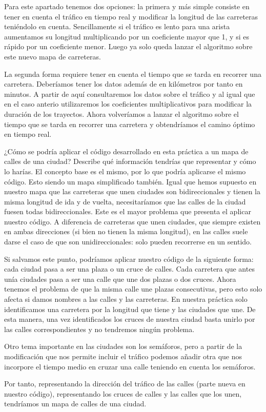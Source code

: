 \documentclass[11pt, a4paper, spanish, openright, twoside]{book}
\begin{document}
	\begin{section}
		Para este apartado tenemos dos opciones: la primera y más simple consiste en tener en cuenta el tráfico en tiempo real y modificar la longitud de las carreteras teniéndolo en cuenta. Sencillamente 
		si el tráfico es lento para una arista aumentamos su longitud multiplicando por un coeficiente mayor que 1, y si es rápido por un coeficiente menor. Luego ya solo queda lanzar el algoritmo sobre este 
		nuevo mapa de carreteras.

		La segunda forma requiere tener en cuenta el tiempo que se tarda en recorrer una carretera. Deberíamos tener los datos además de en kilómetros por tanto en minutos. A partir de aquí consultaremos los datos sobre el tráfico 
		y al igual que en el caso anterio utilizaremos los coeficientes multiplicativos para modificar la duración de los trayectos. Ahora volveríamos a lanzar el algoritmo sobre el tiempo que se tarda en recorrer una carretera y obtendríamos 
		el camino óptimo en tiempo real.


	\end{section}

	\begin{section}{¿Cómo se podría aplicar el código desarrollado en esta práctica a un mapa de calles de una ciudad? Describe qué información tendrías que representar y cómo lo harías.}
		El concepto base es el mismo, por lo que podría aplicarse el mismo código. Esto siendo un mapa simplificado también. Igual que hemos supuesto en nuestro mapa que las carreteras que unen ciudades son
 		bidireccionales y tienen la misma longitud de ida y de vuelta, necesitaríamos que las calles de la ciudad fuesen todas bidireccionales. Este es el mayor problema que presenta el aplicar nuestro código. A diferencia 
		de carreteras que unen ciudades, que siempre existen en ambas direcciones (si bien no tienen la misma longitud), en las calles suele darse el caso de que son unidireccionales: solo pueden recorrerse en un sentido.
		 
		Si salvamos este punto, podríamos aplicar nuestro código de la siguiente forma: cada ciudad pasa a ser una plaza o un cruce de calles. Cada carretera que antes unía ciudades  pasa a ser una calle que une dos 
		plazas o dos cruces. Ahora tenemos el problema de que la misma calle une plazas consecutivas, pero esto solo afecta si damos nombres a las calles y las carreteras. En nuestra práctica solo identificamos una carretera por 
		la longitud que tiene y las ciudades que une. De esta manera, una vez identificados los cruces de nuestra ciudad basta unirlo por las calles correspondientes y no tendremos ningún problema.

		Otro tema importante en las ciudades son los semáforos, pero a partir de  la modificación que nos permite incluir el tráfico podemos añadir otra que nos incorpore el tiempo medio en cruzar una calle teniendo en cuenta 
		los semáforos. 

		Por tanto, representando la dirección del tráfico de las calles (parte nueva en nuestro código), representando los cruces de calles y las calles que los unen, tendríamos un mapa de calles de una ciudad. 		


	\end{section}
\end{document}
